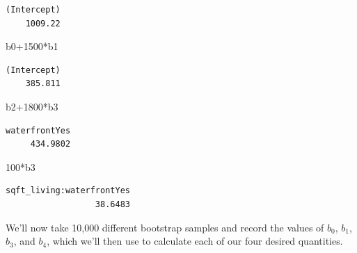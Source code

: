 \documentclass[
  letterpaper,
  DIV=11,
  numbers=noendperiod]{scrreprt}
\newenvironment{Shaded}{\begin{snugshade}}{\end{snugshade}}
\newcommand{\DecValTok}[1]{\textcolor[rgb]{0.68,0.00,0.00}{#1}}
\newcommand{\NormalTok}[1]{\textcolor[rgb]{0.00,0.23,0.31}{#1}}
\newcommand{\SpecialCharTok}[1]{\textcolor[rgb]{0.37,0.37,0.37}{#1}}
\begin{document}
\begin{verbatim}
(Intercept) 
    1009.22 
\end{verbatim}

\begin{Shaded}
\begin{Highlighting}[]
\NormalTok{b0}\SpecialCharTok{+}\DecValTok{1500}\SpecialCharTok{*}\NormalTok{b1}
\end{Highlighting}
\end{Shaded}

\begin{verbatim}
(Intercept) 
    385.811 
\end{verbatim}

\begin{Shaded}
\begin{Highlighting}[]
\NormalTok{b2}\SpecialCharTok{+}\DecValTok{1800}\SpecialCharTok{*}\NormalTok{b3}
\end{Highlighting}
\end{Shaded}

\begin{verbatim}
waterfrontYes 
     434.9802 
\end{verbatim}

\begin{Shaded}
\begin{Highlighting}[]
\DecValTok{100}\SpecialCharTok{*}\NormalTok{b3}
\end{Highlighting}
\end{Shaded}

\begin{verbatim}
sqft_living:waterfrontYes 
                  38.6483 
\end{verbatim}

We'll now take 10,000 different bootstrap samples and record the values
of \(b_0\), \(b_1\), \(b_3\), and \(b_4\), which we'll then use to
calculate each of our four desired quantities.
\end{document}
